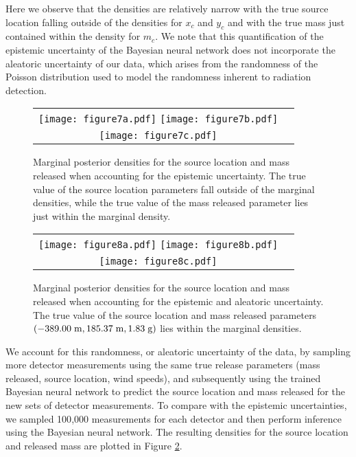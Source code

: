 \documentclass[sn-mathphys-ay]{sn-jnl}
\begin{document}
 Here we observe that the densities are relatively narrow with the true source location falling outside of the densities for $x_c$ and $y_c$ and with the true mass just contained within the density for $m_c$. We note that this quantification of the epistemic uncertainty of the Bayesian neural network does not incorporate the aleatoric uncertainty of our data, which arises from the randomness of the Poisson distribution used to model the randomness inherent to radiation detection.

\begin{figure}[!ht]
 \centering
\begin{tabular}{c c}
    \texttt{[image: figure7a.pdf]}
    \texttt{[image: figure7b.pdf]}\\
    \texttt{[image: figure7c.pdf]}
    \end{tabular}
\caption{Marginal posterior densities for the source location and mass released when accounting for the epistemic uncertainty. The true value of the source location parameters fall outside of the marginal densities, while the true value of the mass released parameter lies just within the marginal density.}
 \label{fig:epistemic}
 \end{figure}

   \begin{figure}[!ht]
 \centering
 \begin{tabular}{c c}
    \texttt{[image: figure8a.pdf]}
    \texttt{[image: figure8b.pdf]}\\
    \texttt{[image: figure8c.pdf]}
    \end{tabular}
\caption{Marginal posterior densities for the source location and mass released when accounting for the epistemic and aleatoric uncertainty. The true value of the source location and mass released parameters $(-389.00 \hspace{1mm} \text{m}, 185.37 \hspace{1mm} \text{m}, 1.83 \hspace{1mm} \text{g})$ lies within the marginal densities.}
\label{fig:aleatoric}
 \end{figure}
 
 We account for this randomness, or aleatoric uncertainty of the data, by sampling more detector measurements using the same true release parameters (mass released, source location, wind speeds), and subsequently using the trained Bayesian neural network to predict the source location and mass released for the new sets of detector measurements. To compare with the epistemic uncertainties, we sampled 100{,}000 measurements for each detector and then perform inference using the Bayesian neural network. The resulting densities for the source location and released mass are plotted in Figure \ref{fig:aleatoric}.
 
\end{document}
